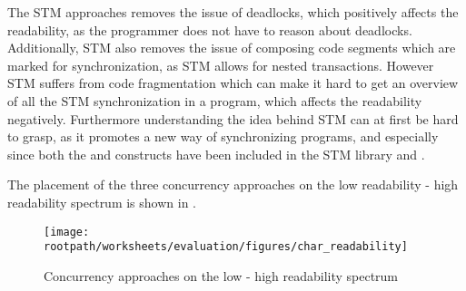 The \ac{STM} approaches removes the issue of deadlocks, which positively affects the readability, as the programmer does not have to reason about deadlocks. Additionally, \ac{STM} also removes the issue of composing code segments which are marked for synchronization, as \ac{STM} allows for nested transactions. However \ac{STM} suffers from code fragmentation which can make it hard to get an overview of all the \ac{STM} synchronization in a program, which affects the readability negatively. Furthermore understanding the idea behind \ac{STM} can at first be hard to grasp, as it promotes a new way of synchronizing programs, and especially since both the  and  constructs have been included in the \ac{STM} library and \stmname.



The placement of the three concurrency approaches on the low readability - high readability spectrum is shown in .

\begin{figure}[htbp]
\centering
 \texttt{[image: \\rootpath/worksheets/evaluation/figures/char\_readability]} 
 \caption{Concurrency approaches on the low - high readability spectrum}
\label{fig:char_readability}
\end{figure}


